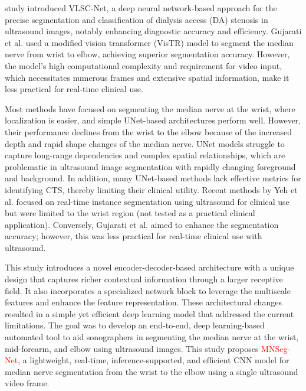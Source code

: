study \cite{stenosismedphys} introduced VLSC-Net, a deep neural network-based approach for the precise segmentation and classification of dialysis access (DA) stenosis in ultrasound images, notably enhancing diagnostic accuracy and efficiency. Gujarati et al. \cite{gujarati2023transformer} used a modified vision transformer (VisTR) model to segment the median nerve from wrist to elbow, achieving superior segmentation accuracy. However, the model's high computational complexity and requirement for video input, which necessitates numerous frames and extensive spatial information, make it less practical for real-time clinical use.

Most methods have focused on segmenting the median nerve at the wrist, where localization is easier, and simple UNet-based architectures perform well. However, their performance declines from the wrist to the elbow because of the increased depth and rapid shape changes of the median nerve. UNet models struggle to capture long-range dependencies and complex spatial relationships, which are problematic in ultrasound image segmentation with rapidly changing foreground and background. In addition, many UNet-based methods lack effective metrics for identifying CTS, thereby limiting their clinical utility. Recent methods by Yeh et al. \cite{yeh2023real} focused on real-time instance segmentation using ultrasound for clinical use but were limited to the wrist region (not tested as a practical clinical application). Conversely, Gujarati et al. \cite{gujarati2023transformer} aimed to enhance the segmentation accuracy; however, this was less practical for real-time clinical use with ultrasound.

This study introduces a novel encoder-decoder-based architecture with a unique design that captures richer contextual information through a larger receptive field. It also incorporates a specialized network block to leverage the multiscale features and enhance the feature representation. These architectural changes resulted in a simple yet efficient deep learning model that addressed the current limitations. The goal was to develop an end-to-end, deep learning-based automated tool to aid sonographers in segmenting the median nerve at the wrist, mid-forearm, and elbow using ultrasound images. This study proposes \textcolor{red}{MNSeg-Net}, a lightweight, real-time, inference-supported, and efficient CNN model for median nerve segmentation from the wrist to the elbow using a single ultrasound video frame.



